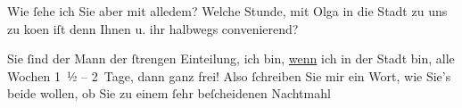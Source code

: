 \pstart
           Wie{ }ſehe ich Sie aber mit alledem? Welche Stunde, mit Olga in die Stadt zu uns zu ko{\geminationm}en
               iſt denn Ihnen u. ihr halbwegs convenierend?\pend
           
\pstart
           Sie{ }ſind der Mann der{ }ſtrengen Einteilung, ich bin, \uline{wenn} ich in der Stadt bin, alle Wochen 1 ½ – 2 Tage, dann ganz frei! Also{ }ſchreiben Sie mir ein Wort, wie Sie’s beide wollen, ob Sie zu einem{ }ſehr beſcheidenen
               Nachtmahl \label{T_L02332-2v}\label{T_L02332-2}\pend
           \endnumbering{}  \newcommand{\dateiname}{L02332}\newcommand{\titel}{Hugo Hofmannsthal an Arthur Schnitzler, 8. 12. [1919]}\newcommand{\editorInnen}{Martin Anton Müller und Gerd-Hermann Susen}
